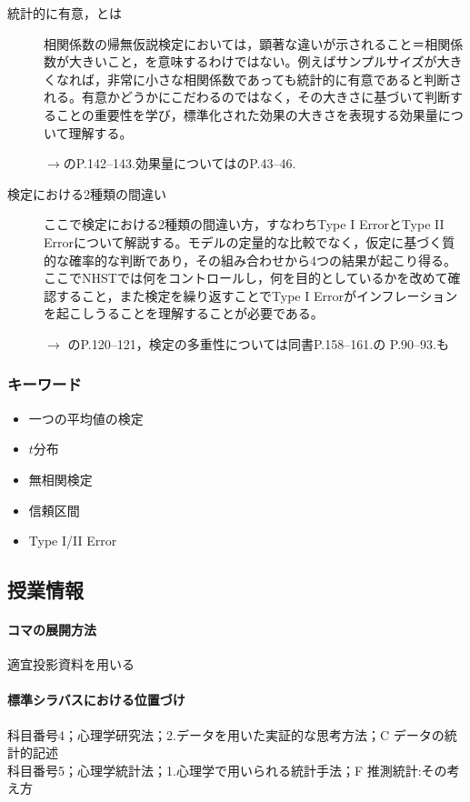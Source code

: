 \begin{description}
\item[統計的に有意，とは]相関係数の帰無仮説検定においては，顕著な違いが示されること＝相関係数が大きいこと，を意味するわけではない。例えばサンプルサイズが大きくなれば，非常に小さな相関係数であっても統計的に有意であると判断される。有意かどうかにこだわるのではなく，その大きさに基づいて判断することの重要性を学び，標準化された効果の大きさを表現する効果量について理解する。
\begin{flushright}
    $\to$\citet{Yamada2004}のP.142--143.効果量については\citet{大久保201201}のP.43--46.
\end{flushright}


\item[検定における2種類の間違い]ここで検定における2種類の間違い方，すなわちType I ErrorとType II Errorについて解説する。モデルの定量的な比較でなく，仮定に基づく質的な確率的な判断であり，その組み合わせから4つの結果が起こり得る。ここでNHSTでは何をコントロールし，何を目的としているかを改めて確認すること，また検定を繰り返すことでType I Errorがインフレーションを起こしうることを理解することが必要である。
\begin{flushright}
    $\to$ \citet{Yamada2004}のP.120--121，検定の多重性については同書P.158--161.\citet{川端201408}の P.90--93.も
\end{flushright}

\end{description}
\subsubsection{キーワード}
\begin{itemize}
\item 一つの平均値の検定
\item $t$分布
\item 無相関検定
\item 信頼区間
\item Type I/II Error
\end{itemize}
\subsection{授業情報}
\paragraph{コマの展開方法}
適宜投影資料を用いる
\paragraph{標準シラバスにおける位置づけ}
科目番号4；心理学研究法；2.データを用いた実証的な思考方法；C データの統計的記述\\
科目番号5；心理学統計法；1.心理学で用いられる統計手法；F 推測統計:その考え方
